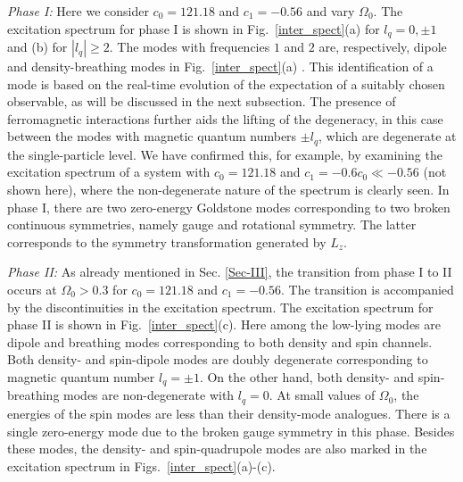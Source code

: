 \documentclass[pra,twocolumn,aps,superscriptaddress,showpacs,longbibliography]{revtex4-1}
\begin{document}
{\it Phase I:} Here we consider $c_0 = 121.18$ and $c_1 = -0.56$ and vary $\Omega_0$. 
The excitation spectrum for phase I is shown in Fig.~\ref{inter_spect}(a) for $l_q = 0, \pm1$ and (b) for $|l_q|\ge2$. 
The modes with frequencies
$1$ and $2$ are, respectively, dipole and density-breathing modes in Fig.~\ref{inter_spect}(a) . This identification of a mode is based on the real-time evolution of the
expectation of a suitably chosen observable, as will be discussed in the next subsection. The presence of ferromagnetic interactions further
aids the lifting of the degeneracy, in this case between the modes with magnetic quantum numbers $\pm l_q$, which are degenerate at the
single-particle level. We have confirmed this, for example, by examining the excitation spectrum
of a system with $c_0 = 121.18$ and $c_1 = -0.6c_0\ll -0.56$ (not shown here), 
where the non-degenerate nature of the spectrum is clearly seen. 
In phase I, there are two zero-energy Goldstone modes corresponding to two broken continuous symmetries, 
namely gauge and rotational symmetry. The latter corresponds to the symmetry transformation generated by $L_z$.
 
{\it Phase II:}
As already mentioned in Sec. \ref{Sec-III}, the transition from phase I to II occurs at $\Omega_0>0.3$
for $c_0 = 121.18$ and $c_1 = -0.56$. The transition
is accompanied by the discontinuities in the excitation spectrum. The excitation spectrum for phase II is shown in Fig.~\ref{inter_spect}(c).
Here among the low-lying modes are dipole and breathing modes corresponding to both density and spin channels. 
Both density- and spin-dipole modes are doubly degenerate corresponding to magnetic quantum number $l_q = \pm 1$.
On the other hand, both density- and spin-breathing modes are non-degenerate with 
$l_q = 0$. At small values of $\Omega_0$, the energies of the spin modes are less than their
density-mode analogues. There is a single zero-energy mode due to the broken gauge symmetry in this phase.
Besides these modes, the density- and spin-quadrupole modes are also marked
in the excitation spectrum in Figs.~\ref{inter_spect}(a)-(c).
\end{document}
